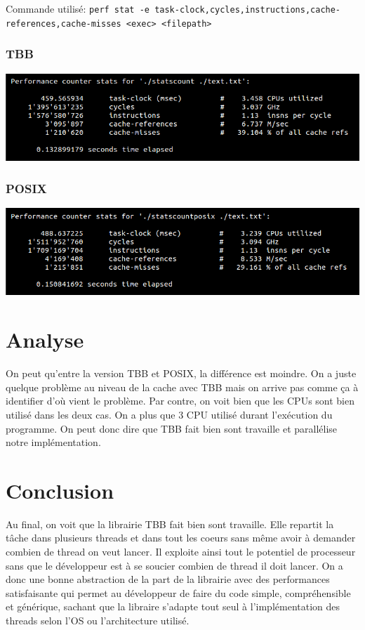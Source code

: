\documentclass[10pt,a4paper]{article}
\begin{document}
Commande utilisé: \texttt{perf stat -e task-clock,cycles,instructions,cache-references,cache-misses <exec> <filepath> }

\subsubsection{TBB}
\includegraphics[scale=0.5]{images/perf_tbb}


\subsubsection{POSIX}
\includegraphics[scale=0.5]{images/perf_posix}
\newpage

\section{Analyse}
On peut qu'entre la version TBB et POSIX, la différence est moindre. On a juste quelque problème au niveau de la cache avec TBB mais on arrive pas comme ça à identifier d'où vient le problème. Par contre, on voit bien que les CPUs sont bien utilisé dans les deux cas. On a plus que 3 CPU utilisé durant l’exécution du programme. On peut donc dire que TBB fait bien sont travaille et parallélise notre implémentation.

\section{Conclusion}
Au final, on voit que la librairie TBB fait bien sont travaille. Elle repartit la tâche dans plusieurs threads et dans tout les coeurs sans même avoir à demander combien de thread on veut lancer. Il exploite ainsi tout le potentiel de processeur sans que le développeur est à se soucier combien de thread il doit lancer. On a donc une bonne abstraction de la part de la librairie avec des performances satisfaisante qui permet au développeur de faire du code simple, compréhensible et générique, sachant que la libraire s'adapte tout seul à l'implémentation des threads selon l'OS ou l'architecture utilisé.
\end{document}
